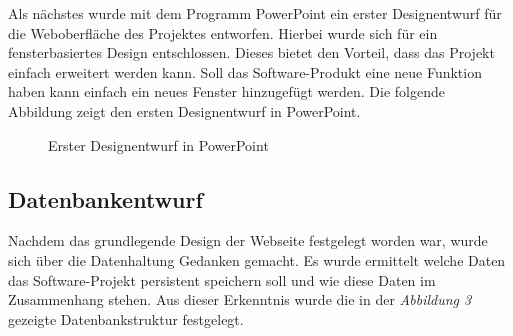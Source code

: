 \documentclass[12pt, a4paper]{article}
\begin{document}
Als nächstes wurde mit dem Programm PowerPoint ein erster Designentwurf für die Weboberfläche des Projektes entworfen. Hierbei wurde sich für ein fensterbasiertes Design entschlossen. Dieses bietet den Vorteil, dass das Projekt einfach erweitert werden kann. Soll das Software-Produkt eine neue Funktion haben kann einfach ein neues Fenster hinzugefügt werden. Die folgende Abbildung zeigt den ersten Designentwurf in PowerPoint.

\begin{figure}[H]
	\begin{center}
	\end{center}
	\caption{Erster Designentwurf in PowerPoint}
\end{figure}

\subsection{Datenbankentwurf}
Nachdem das grundlegende Design der Webseite festgelegt worden war, wurde sich über die Datenhaltung Gedanken gemacht. Es wurde ermittelt welche Daten das Software-Projekt persistent speichern soll und wie diese Daten im Zusammenhang stehen. Aus dieser Erkenntnis wurde die in der \textit{Abbildung 3} gezeigte Datenbankstruktur festgelegt.
\end{document}
